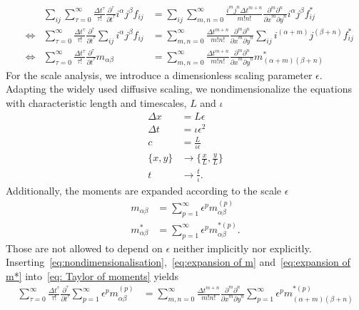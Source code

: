 \documentclass{article}
\begin{document}
\begin{align}
    \nonumber
    & & \sum_{ij} \sum_{\tau = 0}^\infty \frac{{\Delta t}^\tau }{\tau!} \frac{\partial^\tau}{{\partial t}^\tau} i^\alpha j^\beta f_{ij} &=
    \sum_{ij}\sum_{m,n = 0}^\infty \frac{i^m j^n {\Delta t}^{m+n}} {m!n!} \frac{\partial^m \partial^n}{ {\partial x}^m{\partial y}^n}i^\alpha j^\beta f^*_{ij}\\
    \nonumber
    &\Leftrightarrow &
    \sum_{\tau = 0}^\infty \frac{{\Delta t}^\tau }{\tau!} \frac{\partial^\tau}{{\partial t}^\tau} \sum_{ij}i^\alpha j^\beta f_{ij} &=
    \sum_{m,n = 0}^\infty \frac{{\Delta t}^{m+n}} {m!n!} \frac{\partial^m \partial^n}{ {\partial x}^m{\partial y}^n}\sum_{ij}i^{(\alpha + m)} j^{(\beta+n)} f^*_{ij}\\
      \label{eq: Taylor of moments}
     &\Leftrightarrow &
     \sum_{\tau = 0}^\infty \frac{{\Delta t}^\tau }{\tau!} \frac{\partial^\tau}{{\partial t}^\tau} m_{\alpha\beta} &=
    \sum_{m,n = 0}^\infty \frac{{\Delta t}^{m+n}} {m!n!} \frac{\partial^m \partial^n}{ {\partial x}^m{\partial y}^n} m^*_{(\alpha + m)(\beta + n)}
\end{align}
For the scale analysis, we introduce a dimensionless scaling parameter $\epsilon$.
Adapting the widely used diffusive scaling, we nondimensionalize the equations with characteristic length and timescales, $L$ and $\iota$
\begin{equation}
  \label{eq:nondimensionalisation}
  \begin{aligned}
    \Delta x & = L\epsilon \\
    \Delta t & = \iota\epsilon^2 \\
    c & = \frac{L}{\iota\epsilon} \\
    \{x, y\} & \rightarrow \{\frac{x}{L}, \frac{y}{L}\} \\
    t & \rightarrow \frac{t}{\iota}.
  \end{aligned}
\end{equation}
Additionally, the moments are expanded according to the scale $\epsilon$
\begin{align}
    \label{eq:expansion of m}
    m_{\alpha\beta} & = \sum_{p=1}^{\infty} \epsilon^p m_{\alpha\beta}^{(p)} \\
    \label{eq:expansion of m*}
    m^*_{\alpha\beta} & = \sum_{p=1}^{\infty} \epsilon^p m_{\alpha\beta}^{*(p)}.
\end{align}
Those are not allowed to depend on $\epsilon$ neither implicitly nor explicitly.
Inserting~\eqref{eq:nondimensionalisation},~\eqref{eq:expansion of m} and~\eqref{eq:expansion of m*} into~\eqref{eq: Taylor of moments} yields
\begin{align}
  \sum_{\tau = 0}^\infty \frac{{\Delta t}^\tau }{\tau!} \frac{\partial^\tau}{{\partial t}^\tau} \sum_{p=1}^{\infty} \epsilon^p m_{\alpha\beta}^{(p)}  &=
 \sum_{m,n = 0}^\infty \frac{{\Delta t}^{m+n}} {m!n!} \frac{\partial^m \partial^n}{ {\partial x}^m{\partial y}^n} \sum_{p=1}^{\infty} \epsilon^p m_{(\alpha + m)(\beta + n)}^{*(p)}
\end{align}
\end{document}
